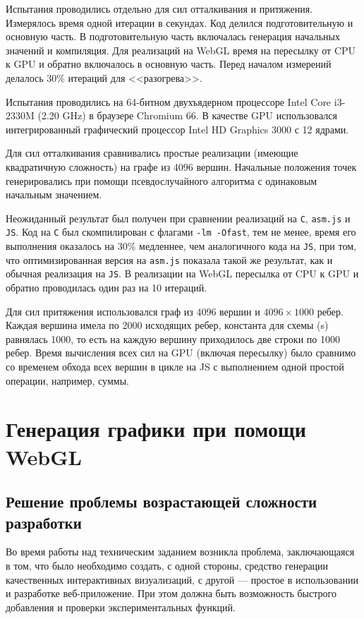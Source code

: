 Испытания проводились отдельно для сил отталкивания и притяжения. Измерялось время одной итерации в секундах. Код делился подготовительную и основную часть. В подготовительную часть включалась генерация начальных значений и компиляция. Для реализаций на WebGL время на пересылку от CPU к GPU и обратно включалось в основную часть. Перед началом измерений делалось $30\%$ итераций для <<разогрева>>.

Испытания проводились на 64-битном двухъядерном процессоре Intel Core i3-2330M (2.20 GHz) в браузере Chromium 66. В качестве GPU использовался интегрированный графический процессор Intel HD Graphics 3000 с 12 ядрами.

Для сил отталкивания сравнивались простые реализации (имеющие квадратичную сложность) на графе из 4096 вершин. Начальные положения точек генерировались при помощи псевдослучайного алгоритма с одинаковым начальным значением.

Неожиданный результат был получен при сравнении реализаций на \texttt{C}, \texttt{asm.js} и \texttt{JS}. Код на \texttt{C} был скомпилирован с флагами \texttt{-lm -Ofast}, тем не менее, время его выполнения оказалось на $30\%$ медленнее, чем аналогичного кода на \texttt{JS}, при том, что оптимизированная версия на \texttt{asm.js} показала такой же результат, как и обычная реализация на \texttt{JS}. В реализации на WebGL пересылка от CPU к GPU и обратно проводилась один раз на 10 итераций.

Для сил притяжения использовался граф из 4096 вершин и $4096 \times 1000$ ребер. Каждая вершина имела по 2000 исходящих ребер, константа для схемы (s) равнялась 1000, то есть на каждую вершину приходилось две строки по 1000 ребер. Время вычисления всех сил на GPU (включая пересылку) было сравнимо со временем обхода всех вершин в цикле на JS с выполнением одной простой операции, например, суммы.

\chapter{Генерация графики при помощи WebGL}

\section{Решение проблемы возрастающей сложности разработки}

Во время работы над техническим заданием возникла проблема, заключающаяся в том, что было необходимо создать, с одной стороны, средство генерации качественных интерактивных визуализаций, с другой --- простое в использовании и разработке веб-приложение. При этом должна быть возможность быстрого добавления и проверки экспериментальных функций.


